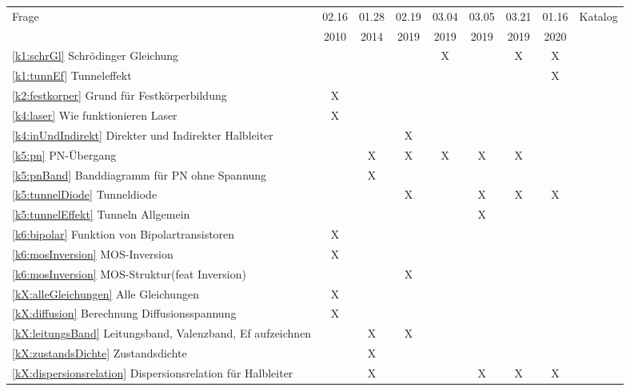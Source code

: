 \documentclass{article}
\begin{document}
\begin{table}[h]

\begin{adjustbox}{width=\textwidth}
\begin{tabular}{lcccccccc}
Frage                & 02.16 & 01.28 & 02.19 & 03.04 & 03.05 & 03.21 & 01.16 & Katalog\\
                     & 2010  & 2014  & 2019  & 2019  & 2019  & 2019  & 2020 & \\
                     \hline
\ref{k1:schrGl} Schrödinger Gleichung&&&& X &  & X & X &  \\
\ref{k1:tunnEf} Tunneleffekt&&&&&&&X & \\
\ref{k2:festkorper} Grund für Festkörperbildung & X &&&&&&& \\
\ref{k4:laser} Wie funktionieren Laser & X &&&&&&& \\
\ref{k4:inUndIndirekt} Direkter und Indirekter Halbleiter&&& X &&&&& \\
\ref{k5:pn} PN-\"Ubergang && X & X & X &X&X&& \\
\ref{k5:pnBand} Banddiagramm f\"ur PN ohne Spannung  && X &&&&&& \\
\ref{k5:tunnelDiode} Tunneldiode&&& X && X & X & X & \\
\ref{k5:tunnelEffekt} Tunneln Allgemein&&&&& X &&& \\
\ref{k6:bipolar} Funktion von Bipolartransistoren & X &&&&&&& \\
\ref{k6:mosInversion} MOS-Inversion & X &&&&&&& \\
\ref{k6:mosInversion} MOS-Struktur(feat Inversion)&&& X &&&&& \\
\ref{kX:alleGleichungen} Alle Gleichungen & X &&&&&&& \\
\ref{kX:diffusion} Berechnung Diffusionsspannung & X &&&&&&& \\
\ref{kX:leitungsBand} Leitungsband, Valenzband, Ef aufzeichnen && X & X &&&&& \\
\ref{kX:zustandsDichte} Zustandsdichte&& X &&&&& \\
\ref{kX:dispersionsrelation} Dispersionsrelation für Halbleiter && X &&& X & X & X & \\
\hline

\hline
\end{tabular}
\end{adjustbox}
\end{table}

\end{document}
